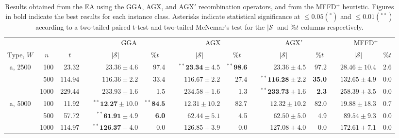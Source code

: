 \documentclass[authoryear]{elsarticle}
\begin{document}
\begin{table}[h!]
\setlength{\tabcolsep}{4pt}
\centering
\caption{Results obtained from the EA using the GGA, AGX, and AGX$'$ recombination operators, and from the MFFD$^+$ heuristic. Figures in bold indicate the best results for each instance class. Asterisks indicate statistical significance at $\leq 0.05 (^{*})$ and $\leq 0.01 (^{**})$ according to a two-tailed paired t-test and two-tailed McNemar's test for the $|\mathcal{S}|$ and $\%t$ columns respectively. }
\scriptsize
\begin{threeparttable}
\begin{tabular}{crrcrrcrrcrrcrr}
	\toprule
	& & & & \multicolumn{2}{c}{GGA} &\phantom{}& \multicolumn{2}{c}{AGX} &\phantom{}& \multicolumn{2}{c}{AGX$'$} &\phantom{} & \multicolumn{2}{c}{MFFD$^+$}\\
	\cmidrule{5-6} \cmidrule{8-9} \cmidrule{11-12} \cmidrule{14-15}
	\multicolumn{1}{c}{Type, $W$} & \multicolumn{1}{c}{$n$} & \multicolumn{1}{c}{$t$\tnote{$a$}} && \multicolumn{1}{c}{$|\mathcal{S}|$\tnote{$b$}} & \multicolumn{1}{c}{$\% t$\tnote{$c$}} && \multicolumn{1}{c}{$|\mathcal{S}|$} & \multicolumn{1}{c}{$\% t$} && \multicolumn{1}{c}{$|\mathcal{S}|$} & \multicolumn{1}{c}{$\% t$} && \multicolumn{1}{c}{$|\mathcal{S}|$} & \multicolumn{1}{c}{$\% t$}\\
	\midrule
	a, 2500 & 100 & 23.32 && $23.36 \pm 4.6$ & 97.4 && $^{**}\textbf{23.34} \pm 4.5$ & $^{**}\textbf{98.6}$ && $23.36 \pm 4.5$ & 97.2 && $28.46 \pm 10.4$ & 2.6 \\
	& 500 & 114.94 && $116.36 \pm 2.2$ & 33.4 && $116.67 \pm 2.2$ & 27.4 && $^{**}\textbf{116.28} \pm 2.2$ &\textbf{35.0} && $132.65 \pm 4.9$ & 0.0 \\
	& 1000 & 229.44 && $233.93 \pm 1.6$ & 1.5 && $234.58 \pm 1.6$ & 1.3 && $^{**}\textbf{233.73} \pm 1.6$ &\textbf{2.3} && $258.39 \pm 3.5$ & 0.0 \\
	\midrule
	a, 5000 & 100 & 11.92 && $^{**}\textbf{12.27} \pm 10.0$ & $^{**}\textbf{84.5}$ && $12.31 \pm 10.2$ & 82.7 && $12.32 \pm 10.2$ & 82.0 && $19.88 \pm 18.3$ & 0.7 \\
	& 500 & 57.72 && $^{**}\textbf{61.91} \pm 4.9$ & \textbf{6.0} && $62.44 \pm 5.1$ & 4.5 && $62.50 \pm 5.0$ & 4.9 && $89.54 \pm 9.3$ & 0.0 \\
	& 1000 & 114.97 && $^{**}\textbf{126.37} \pm 4.0$ & 0.0 && $126.85 \pm 3.9$ & 0.0 && $127.08 \pm 4.0$ & 0.0 && $172.61 \pm 7.1$ & 0.0 \\
	\midrule
	\midrule

\end{tabular}
\end{threeparttable}
\end{table}
\end{document}
